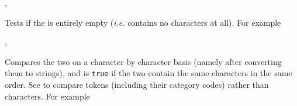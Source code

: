 \documentclass[oneside]{book}
\begin{document}
\begin{function}{\StrIfEmpty,\StrIfEmptyTF}
\begin{syntax}
 
   
\end{syntax}
Tests if the  is entirely empty
(\emph{i.e.} contains no characters at all). For example
\begin{demohigh}
\StrSet{}
\StrIfEmptyTF{}
\StrClear\lTmpaStr
\StrIfEmptyTF{}
\end{demohigh}
\end{function}

\begin{function}{\StrIfEq,\StrIfEqTF}
\begin{syntax}
  
    
\end{syntax}
Compares the two  on a character by character
basis (namely after converting them to strings),
and is \texttt{true} if the two  contain the same
characters in the same order.
See  to compare
tokens (including their category codes) rather than characters.
For example
\begin{demohigh}
\end{demohigh}
\begin{demohigh}
\StrSet{}
\StrSet{}
\StrSet{}
\end{demohigh}
\end{function}
\end{document}
